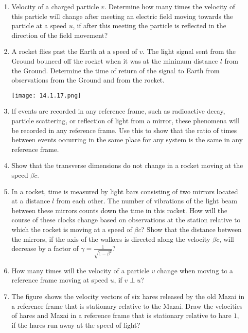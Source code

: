 \documentclass{article}
\begin{document}
\begin{enumerate}[label=14.1.\arabic*]
\item Velocity of a charged particle $v$. Determine how many times the velocity of this particle will change after meeting an electric field moving towards the particle at a speed $u$, if after this meeting the particle is reflected in the direction of the field movement?

\item A rocket flies past the Earth at a speed of $v$. The light signal sent from the Ground bounced off the rocket when it was at the minimum distance $l$ from the Ground. Determine the time of return of the signal to Earth from observations from the Ground and from the rocket.
\begin{center}
    \texttt{[image: 14.1.17.png]}
\end{center}

\item If events are recorded in any reference frame, such as radioactive decay, particle scattering, or reflection of light from a mirror, these phenomena will be recorded in any reference frame. Use this to show that the ratio of times between events occurring in the same place for any system is the same in any reference frame.

\item Show that the transverse dimensions do not change in a rocket moving at the speed $\beta c$.

\item In a rocket, time is measured by light bars consisting of two mirrors located at a distance $l$ from each other. The number of vibrations of the light beam between these mirrors counts down the time in this rocket. How will the course of these clocks change based on observations at the station relative to which the rocket is moving at a speed of $\beta c$? Show that the distance between the mirrors, if the axis of the walkers is directed along the velocity $\beta c$, will decrease by a factor of $\gamma = \frac{1}{\sqrt{1-\beta^2}}$?

\item How many times will the velocity of a particle $v$ change when moving to a reference frame moving at speed $u$, if $v \perp u$?

\item The figure shows the velocity vectors of six hares released by the old Mazai in a reference frame that is stationary relative to the Mazai. Draw the velocities of hares and Mazai in a reference frame that is stationary relative to hare $1$, if the hares run away at the speed of light?


\end{enumerate}
\end{document}
